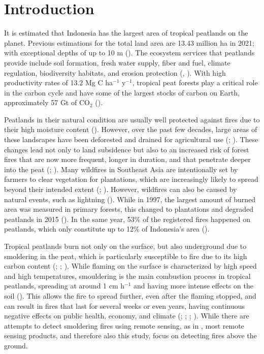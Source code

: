\documentclass[
  fontsize=12pt,
  paper=a4,
  parskip=half,
  headings=big,
  DIV=12
]{scrreprt}
\begin{document}
\chapter{Introduction}

It is estimated that Indonesia has the largest area of tropical peatlands on the planet. Previous estimations for the total land area are 13.43 million ha in 2021; with exceptional depths of up to 10 m (\cite{anda_revisiting_2021}). The ecosystem services that peatlands provide include soil formation, fresh water supply, fiber and fuel, climate regulation, biodiversity habitats, and erosion protection (\cite{anda_revisiting_2021}, \cite{setiawan_spatio-temporal_2025}). With high productivity rates of 13.2 Mg C ha$^{-1}$ y$^{-1}$, tropical peat forests play a critical role in the carbon cycle and have some of the largest stocks of carbon on Earth, approximately 57 Gt of CO$_2$ (\cite{kauffman_total_2025}).

Peatlands in their natural condition are usually well protected against fires due to their high moisture content (\cite{kiely_new_2019}). However, over the past few decades, large areas of these landscapes have been deforested and drained for agricultural use (\cite{kiely_new_2019}; \cite{schmidt_fire_2024}). These changes lead not only to land subsidence but also to an increased risk of forest fires that are now more frequent, longer in duration, and that penetrate deeper into the peat (\cite{anshari_peatland_2026}; \cite{dadap_drainage_2021}). Many wildfires in Southeast Asia are intentionally set by farmers to clear vegetation for plantations, which are increasingly likely to spread beyond their intended extent (\cite{rein_smouldering_2021}; \cite{schmidt_fire_2024}). However, wildfires can also be caused by natural events, such as lightning (\cite{rein_smouldering_2021}). While in 1997, the largest amount of burned area was measured in primary forests, this changed to plantations and degraded peatlands in 2015 (\cite{setiawan_spatio-temporal_2025}). In the same year, 53\% of the registered fires happened on peatlands, which only constitute up to 12\% of Indonesia’s area (\cite{kiely_new_2019}).

Tropical peatlands burn not only on the surface, but also underground due to smoldering in the peat, which is particularly susceptible to fire due to its high carbon content (\cite{grosvenor_catastrophic_2024}; \cite{rein_smouldering_2021}; \cite{setiawan_spatio-temporal_2025}). While flaming on the surface is characterized by high speed and high temperatures, smouldering is the main combustion process in tropical peatlands, spreading at around 1 cm h$^{-1}$ and having more intense effects on the soil (\cite{rein_smouldering_2021}). This allows the fire to spread further, even after the flaming stopped, and can result in fires that last for several weeks or even years, having continuous negative effects on public health, economy, and climate (\cite{grosvenor_catastrophic_2024}; \cite{kiely_new_2019}; \cite{rein_smouldering_2021}; \cite{schmidt_fire_2024}). While there are attempts to detect smoldering fires using remote sensing, as in \textcite{sofan_detection_2019}, most remote sensing products, and therefore also this study, focus on detecting fires above the ground.
\end{document}
